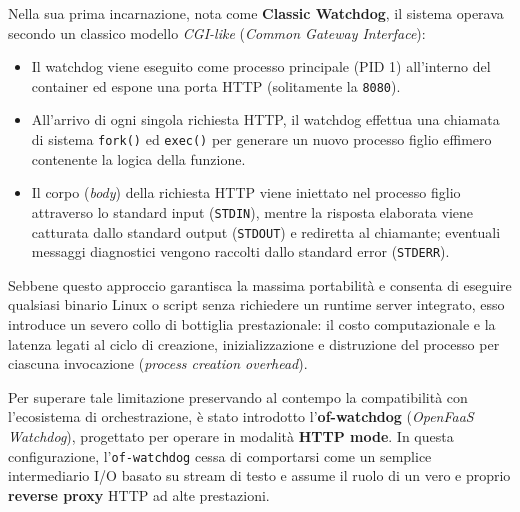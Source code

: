 \documentclass[11pt, a4paper]{article}
\begin{document}
Nella sua prima incarnazione, nota come \textbf{Classic Watchdog}, il sistema operava secondo un classico modello \emph{CGI-like} (\emph{Common Gateway Interface}):
\begin{itemize}[noitemsep]
    \item Il watchdog viene eseguito come processo principale (PID 1) all'interno del container ed espone una porta HTTP (solitamente la \texttt{8080}).
    \item All'arrivo di ogni singola richiesta HTTP, il watchdog effettua una chiamata di sistema \texttt{fork()} ed \texttt{exec()} per generare un nuovo processo figlio effimero contenente la logica della funzione.
    \item Il corpo (\emph{body}) della richiesta HTTP viene iniettato nel processo figlio attraverso lo standard input (\texttt{STDIN}), mentre la risposta elaborata viene catturata dallo standard output (\texttt{STDOUT}) e rediretta al chiamante; eventuali messaggi diagnostici vengono raccolti dallo standard error (\texttt{STDERR}).
\end{itemize}
Sebbene questo approccio garantisca la massima portabilità e consenta di eseguire qualsiasi binario Linux o script senza richiedere un runtime server integrato, esso introduce un severo collo di bottiglia prestazionale: il costo computazionale e la latenza legati al ciclo di creazione, inizializzazione e distruzione del processo per ciascuna invocazione (\emph{process creation overhead}).

Per superare tale limitazione preservando al contempo la compatibilità con l'ecosistema di orchestrazione, è stato introdotto l'\textbf{of-watchdog} (\emph{OpenFaaS Watchdog}), progettato per operare in modalità \textbf{HTTP mode}. In questa configurazione, l'\texttt{of-watchdog} cessa di comportarsi come un semplice intermediario I/O basato su stream di testo e assume il ruolo di un vero e proprio \textbf{reverse proxy} HTTP ad alte prestazioni.

\end{document}
